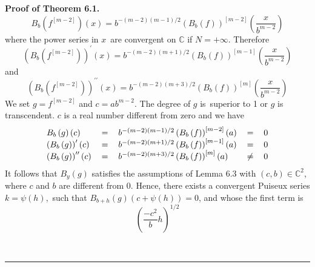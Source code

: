 \documentclass{article}
\newenvironment{proof}[1][Proof]{\textbf{#1.} }{\ \rule{0.5em}{0.5em}}
\begin{document}
\begin{proof}[Proof of Theorem 6.1]
\begin{equation*}
B_{b}\left( f^{\left[ m-2\right] }\right) \left( x\right) =b^{-\left(
m-2\right) \left( m-1\right) /2}\left( B_{b}\left( f\right) \right) ^{\left[
m-2\right] }\left( \dfrac{x}{b^{m-2}}\right) 
\end{equation*}
where the power series in $x$\ are convergent on $\mathbb{C}$ if $N=+\infty $. Therefore 
\begin{equation*}
\left( B_{b}\left( f^{\left[ m-2\right] }\right) \right) ^{\prime }\left(
x\right) =b^{-\left( m-2\right) \left( m+1\right) /2}\left( B_{b}\left(
f\right) \right) ^{\left[ m-1\right] }\left( \dfrac{x}{b^{m-2}}\right) 
\end{equation*}
and 
\begin{equation*}
\left( B_{b}\left( f^{\left[ m-2\right] }\right) \right) ^{\prime \prime
}\left( x\right) =b^{-\left( m-2\right) \left( m+3\right) /2}\left(
B_{b}\left( f\right) \right) ^{\left[ m\right] }\left( \dfrac{x}{b^{m-2}}\right) 
\end{equation*}
We set $g=f^{\left[ m-2\right] }$ and $c=ab^{m-2}$. The degree of $g$ is\
superior to 1 or $g$ is transcendent. $c$ is a real number different from
zero and we have 
\begin{equation*}
\begin{tabular}{lllll}
$B_{b}\left( g\right) \left( c\right) $ & $=$ & $b^{-\left( m-2\right)
\left( m-1\right) /2}\left( B_{b}\left( f\right) \right) ^{\left[ m-2\right]
}\left( a\right) $ & $=$ & $0$ \\ 
$\left( B_{b}\left( g\right) \right) ^{\prime }\left( c\right) $ & $=$ & $b^{-\left( m-2\right) \left( m+1\right) /2}\left( B_{b}\left( f\right)
\right) ^{\left[ m-1\right] }\left( a\right) $ & $=$ & $0$ \\ 
$\left( B_{b}\left( g\right) \right) ^{\prime \prime }\left( c\right) $ & $=$
& $b^{-\left( m-2\right) \left( m+3\right) /2}\left( B_{b}\left( f\right)
\right) ^{\left[ m\right] }\left( a\right) $ & $\neq $ & $0$\end{tabular}
\end{equation*}
It follows that $B_{y}\left( g\right) $ satisfies the assumptions of Lemma
6.3 with $\left( c,b\right) \in \mathbb{C}^{2}$, where $c$ and $b$ are
different from $0$. Hence, there exists a convergent Puiseux series $k=\psi
\left( h\right) ,$ such that $B_{b+h}\left( g\right) \left( c+\psi \left(
h\right) \right) =0$, and whose the first term is 
\begin{equation*}
\left( \dfrac{-c^{2}}{b}h\right) ^{1/2}
\end{equation*}

\end{proof}
\end{document}
